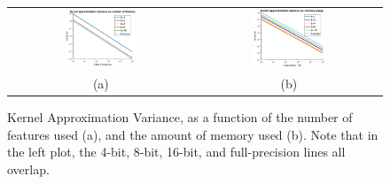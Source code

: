 \documentclass[12pt]{article}
\begin{document}
\begin{figure}
	\centering
	\begin{tabular}{c c}
		\includegraphics[width=0.4\textwidth]{figures/var_vs_numfeat.eps} &
		\includegraphics[width=0.4\textwidth]{figures/var_vs_numbits.eps}  \\
		(a) & (b) \\
	\end{tabular}
	\caption{Kernel Approximation Variance, as a function of the number of features used (a), and the amount of memory used (b).  Note that in the left plot, the 4-bit, 8-bit, 16-bit, and full-precision lines all overlap.}
\label{fig:kernel_approx_var}
\end{figure}
\end{document}

